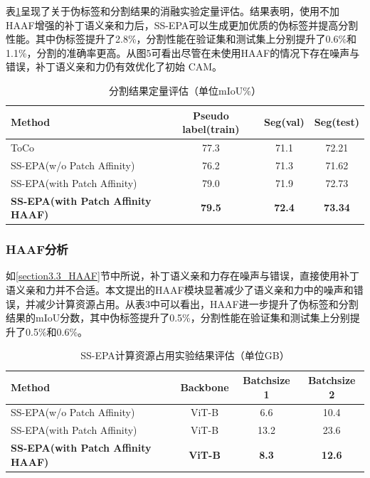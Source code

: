 表\ref{table3}呈现了关于伪标签和分割结果的消融实验定量评估。结果表明，使用不加HAAF增强的补丁语义亲和力后，SS-EPA可以生成更加优质的伪标签并提高分割性能。其中伪标签提升了2.8\%，分割性能在验证集和测试集上分别提升了0.6\%和1.1\%，分割的准确率更高。从图5可看出尽管在未使用HAAF的情况下存在噪声与错误，补丁语义亲和力仍有效优化了初始 CAM。

\begin{table}[!htbp]
    \centering
    \caption{分割结果定量评估（单位mIoU\%）}\label{table3}
    \tiny
    \begin{tabular}{lccc}
        \toprule
        Method & Pseudo label(train) & Seg(val) & Seg(test) \\
        \midrule
        ToCo & 77.3 & 71.1 & 72.21 \\
        SS-EPA(w/o Patch Affinity) & 76.2 & 71.3 & 71.62 \\
        SS-EPA(with Patch Affinity) & 79.0 & 71.9 & 72.73 \\
        \textbf{SS-EPA(with Patch Affinity HAAF)} & \textbf{79.5} & \textbf{72.4} & \textbf{73.34} \\  
        \bottomrule
    \end{tabular}
\end{table}

\begin{CJK*}{UTF8}{zhhei}
    \subsubsection{HAAF分析}
\end{CJK*}

如\ref{section3.3_HAAF}节中所说，补丁语义亲和力存在噪声与错误，直接使用补丁语义亲和力并不合适。本文提出的HAAF模块显著减少了语义亲和力中的噪声和错误，并减少计算资源占用。从表3中可以看出，HAAF进一步提升了伪标签和分割结果的mIoU分数，其中伪标签提升了0.5\%，分割性能在验证集和测试集上分别提升了0.5\%和0.6\%。

\begin{table}[!htbp]
    \centering
    \caption{SS-EPA计算资源占用实验结果评估（单位GB）}\label{table4}
    \tiny
    \begin{tabular}{lccc}
        \toprule
        Method & Backbone & Batchsize 1 & Batchsize 2 \\
        \midrule
        SS-EPA(w/o Patch Affinity) & ViT-B & 6.6 & 10.4 \\
        SS-EPA(with Patch Affinity) & ViT-B & 13.2 & 23.6 \\
        \textbf{SS-EPA(with Patch Affinity HAAF)} & \textbf{ViT-B} & \textbf{8.3} & \textbf{12.6} \\  
        \bottomrule
    \end{tabular}
\end{table}

